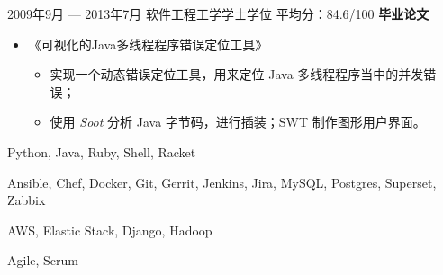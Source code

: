 \documentclass{resume}
\begin{document}
\begin{body}
\begin{itemize}
	\end{itemize}

	\smallskip
	{2009年9月 --- 2013年7月}
	{软件工程工学学士学位}
	{平均分：84.6/100}
	\textbf{毕业论文}
	\begin{itemize}
	\item 《可视化的Java多线程程序错误定位工具》
	\begin{itemize}
		\item 实现一个动态错误定位工具，用来定位 Java 多线程程序当中的并发错误；
		\item 使用 \textit{Soot} 分析 Java 字节码，进行插装；SWT 制作图形用户界面。
	\end{itemize}
	\end{itemize}
\end{body}

\smallskip


\begin{body}
\begin{description}[style=nextline,leftmargin=8em,topsep=1pt]
	\item[语言] Python, Java, Ruby, Shell, Racket
	\item[工具] Ansible, Chef, Docker, Git, Gerrit, Jenkins, Jira, MySQL, Postgres, Superset, Zabbix
	\item[框架] AWS, Elastic Stack, Django, Hadoop
	\item[方法] Agile, Scrum
\end{description}
\end{body}





%
\end{document}
